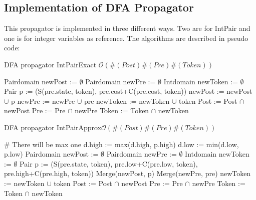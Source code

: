\documentclass[a4paper,11pt]{article}
\begin{document}
\subsection{Implementation of DFA Propagator}
This propagator is implemented in three different ways. Two are for IntPair and one is for integer variables as reference. The algorithms are described in pseudo code:
\begin{algorithm}[H]
\caption{DFA propagator IntPairExact \newline $\mathcal{O}(\#(Post)\#(Pre)\#(Token))$}

\begin{algorithmic}[1]
\State Pairdomain newPost := $\emptyset$
\State Pairdomain newPre := $\emptyset$
\State Intdomain newToken := $\emptyset$
		\State Pair p := (S(pre.state, token), pre.cost+C(pre.cost, token))
			\State newPost := newPost $\cup$ p
			\State newPre := newPre $\cup$ pre
			\State newToken := newToken $\cup$ token 
		\EndIf
	\EndFor
\EndFor
\State Post := Post $\cap$ newPost
\State Pre := Pre $\cap$ newPre
\State Token := Token $\cap$ newToken
\EndProcedure
\end{algorithmic}
\end{algorithm}

\begin{algorithm}[H]
\caption{DFA propagator IntPairApprox\newline $\mathcal{O}(\#(Post)\#(Pre)\#(Token))$}
\begin{algorithmic}[1]
 \# There will be max one
	\State d.high := max(d.high, p.high)
	\State d.low := min(d.low, p.low)
\EndFor
\EndProcedure
{}
\State Pairdomain newPost := $\emptyset$
\State Pairdomain newPre := $\emptyset$
\State Intdomain newToken := $\emptyset$
		\State Pair p := (S(pre.state, token), pre.low+C(pre.low, token), pre.high+C(pre.high, token))
			\State Merge(newPost, p)
			\State Merge(newPre, pre)
			\State newToken := newToken $\cup$ token 
		\EndIf
	\EndFor
\EndFor
\State Post := Post $\cap$ newPost
\State Pre := Pre $\cap$ newPre
\State Token := Token $\cap$ newToken
\EndProcedure
\end{algorithmic}
\end{algorithm}
\end{document}
